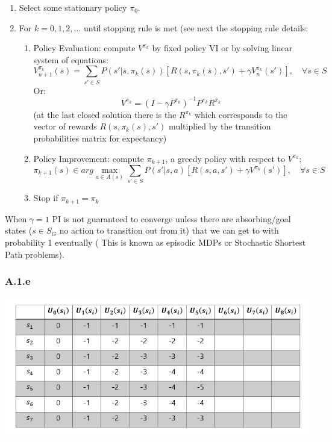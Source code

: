 \documentclass[12pt]{article}
\begin{document}
\begin{enumerate}
\item Select some stationary policy $\pi_0$.
\item For $k = 0,1,2, \ldots $ until stopping rule is met (see next the stopping rule details:
\begin{enumerate}
\item Policy Evaluation: compute $V^{\pi_k}$ by fixed policy VI or by solving linear system of equations:\\
$$V^{\pi_k}_{n + 1}(s) = \sum_{s' \in S} P(s'|s,\pi_k(s))[R(s,\pi_k(s),s') + \gamma V^{\pi_k}_n(s')], \quad \forall s \in S$$
Or:\\
$$V^{\pi_k} = (I - \gamma P^{\pi_k})^{-1} P^{\pi_k}R^{\pi_k}$$
(at the last closed solution there is the $R^{\pi_k}$ which corresponds to the vector of rewards $R(s,\pi_k(s),s')$ multiplied by the transition probabilities matrix for expectancy)
\item Policy Improvement: compute $\pi_{k+1}$, a greedy policy with respect to $V^{\pi_k}$:
$$\pi_{k+1}(s) \in arg\max_{a\in A(s)} \sum_{s' \in S} P(s'|s,a)[R(s,a,s') + \gamma V^{\pi_k}(s')], \quad \forall s \in S$$
\item Stop if $\pi_{k+1} = \pi_{k}$
\end{enumerate}
\end{enumerate}

When $\gamma=1$ PI is not guaranteed to converge unless there are absorbing/goal states ($s\in S_G$ no action to transition out from it) that we can get to with probability 1 eventually ( This is known as episodic MDPs or Stochastic Shortest Path problems).

\subsubsection*{A.1.e}

\includegraphics[]{hw3/plots/A_5.PNG}
\end{document}
